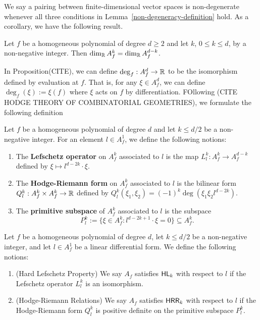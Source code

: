 \documentclass{puthesis-UG}
\begin{document}
We say a pairing between finite-dimensional vector spaces is non-degenerate whenever all three conditions in Lemma~\ref{non-degeneracy-definition} hold. As a corollary, we have the following result.

\begin{cor} \label{same-dimensions}
	Let $f$ be a homogeneous polynomial of degree $d \geq 2$ and let $k$, $0 \leq k \leq d$, by a non-negative integer. Then $\dim_{\mathbb{R}} A_f^k = \dim_{\mathbb{R}} A_f^{d-k}$. 
\end{cor}

In Proposition(CITE), we can define $\deg_f : A_f^d \to \mathbb{R}$ to be the isomorphism defined by evaluation at $f$. That is, for any $\xi \in A_f^d$, we can define $\deg_f (\xi) := \xi(f)$ where $\xi$ acts on $f$ by differentiation. FOllowing (CITE HODGE THEORY OF COMBINATORIAL GEOMETRIES), we formulate the following definition

\begin{defn}
	Let $f$ be a homogeneous polynomial of degree $d$ and let $k \leq d/2$ be a non-negative integer. For an element $l \in A_f^1$, we define the following notions:
	\begin{enumerate}[label = (\alph*)]
		\item The \textbf{Lefschetz operator} on $A_f^k$ associated to $l$ is the map $L_l^k : A_f^k \to A_f^{d-k}$ defined by $\xi \mapsto l^{d-2k} \cdot \xi$. 

		\item The \textbf{Hodge-Riemann form} on $A_f^k$ associated to $l$ is the bilinear form $Q_l^k : A_f^k \times A_f^k \to \mathbb{R}$ defined by $Q_l^k (\xi_1, \xi_2) = (-1)^k \deg (\xi_1 \xi_2 l^{d-2k})$.

		\item The \textbf{primitive subspace} of $A_f^k$ associated to $l$ is the subspace
		\[
			P_l^k := \{\xi \in A_f^k : l^{d-2k+1} \cdot \xi = 0\} \subseteq A_f^k.
		\]
	\end{enumerate}
\end{defn}

\begin{defn}
	Let $f$ be a homogeneous polynomial of degree $d$, let $k \leq d/2$ be a non-negative integer, and let $l \in A_f^1$ be a linear differential form. We define the following notions:
	\begin{enumerate}[label = (\alph*)]
		\item (Hard Lefschetz Property) We say $A_f$ satisfies $\mathsf{HL}_k$ with respect to $l$ if the Lefschetz operator $L_l^k$ is an isomorphism.

		\item (Hodge-Riemann Relations) We say $A_f$ satisfies $\mathsf{HRR}_k$ with respect to $l$ if the Hodge-Riemann form $Q_l^k$ is positive definite on the primitive subspace $P_l^k$. 
	\end{enumerate}
\end{defn}
\end{document}
